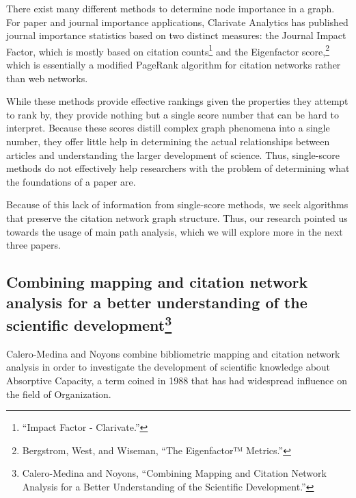 \documentclass[lettepaper,]{article}
\begin{document}
There exist many different methods to determine node importance in a
graph. For paper and journal importance applications, Clarivate
Analytics has published journal importance statistics based on two
distinct measures: the Journal Impact Factor, which is mostly based on
citation counts\footnote{``Impact Factor - Clarivate.''} and the
Eigenfactor score,\footnote{Bergstrom, West, and Wiseman, ``The
  Eigenfactor™ Metrics.''} which is essentially a modified PageRank
algorithm for citation networks rather than web networks.

While these methods provide effective rankings given the properties they
attempt to rank by, they provide nothing but a single score number that
can be hard to interpret. Because these scores distill complex graph
phenomena into a single number, they offer little help in determining
the actual relationships between articles and understanding the larger
development of science. Thus, single-score methods do not effectively
help researchers with the problem of determining what the foundations of
a paper are.

Because of this lack of information from single-score methods, we seek
algorithms that preserve the citation network graph structure. Thus, our
research pointed us towards the usage of main path analysis, which we
will explore more in the next three papers.

\hypertarget{combining-mapping-and-citation-network-analysis-for-a-better-understanding-of-the-scientific-development-calero-medinacombiningmappingcitation2008}{%
\subsection[Combining mapping and citation network analysis for a better
understanding of the scientific development]{\texorpdfstring{Combining
mapping and citation network analysis for a better understanding of the
scientific development\footnote{Calero-Medina and Noyons, ``Combining
  Mapping and Citation Network Analysis for a Better Understanding of
  the Scientific Development.''}}{Combining mapping and citation network analysis for a better understanding of the scientific development}}\label{combining-mapping-and-citation-network-analysis-for-a-better-understanding-of-the-scientific-development-calero-medinacombiningmappingcitation2008}}

Calero-Medina and Noyons combine bibliometric mapping and citation
network analysis in order to investigate the development of scientific
knowledge about Absorptive Capacity, a term coined in 1988 that has had
widespread influence on the field of Organization.
\end{document}
